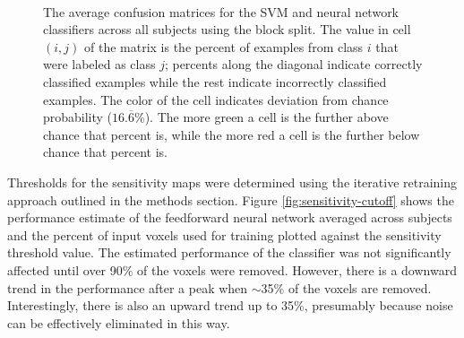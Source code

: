 \documentclass[review,1p,authoryear]{elsarticle}
\begin{document}
\begin{figure}
\centering
\begin{subfigure}{0.3\textwidth}
\centering
\begin{adjustbox}{center}

\end{adjustbox}
\caption{}
\label{fig:average-confusion-svm}
\end{subfigure}
\\
\begin{subfigure}{0.3\textwidth}
\centering
\begin{adjustbox}{center}

\end{adjustbox}
\caption{}
\label{fig:average-confusion-nn}
\end{subfigure}
\caption{The average confusion matrices for the  SVM and  neural network classifiers across all subjects using the block split.
The value in cell $(i,j)$ of the matrix is the percent of examples from class $i$ that were labeled as class $j$; percents along the diagonal indicate correctly classified examples while the rest indicate incorrectly classified examples.
The color of the cell indicates deviation from chance probability ($16.\overline{6}$\%).
The more green a cell is the further above chance that percent is, while the more red a cell is the further below chance that percent is.}
\label{fig:average-confusion}
\end{figure}

Thresholds for the sensitivity maps were determined using the iterative retraining approach outlined in the methods section.
Figure \ref{fig:sensitivity-cutoff} shows the performance estimate of the feedforward neural network averaged across subjects and the percent of input voxels used for training plotted against the sensitivity threshold value.
The estimated performance of the classifier was not significantly affected until over 90\% of the voxels were removed.
However, there is a downward trend in the performance after a peak when $\sim$35\% of the voxels are removed.
Interestingly, there is also an upward trend up to 35\%, presumably because noise can be effectively eliminated in this way.
\end{document}
